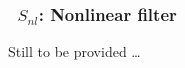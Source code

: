 \vsssub
\subsubsection{~$S_{nl}$: Nonlinear filter} \label{sec:NLS}
\vsssub


\noindent
Still to be provided \ldots
